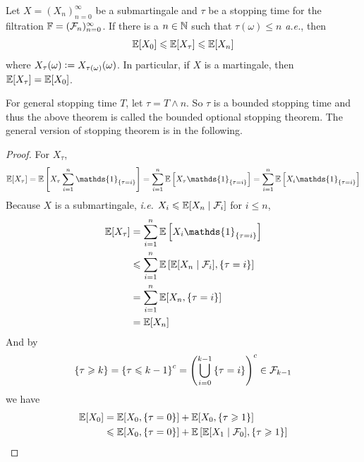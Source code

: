 \documentclass[a4paper,12pt]{article}
\begin{document}
\begin{itemize}
  \begin{thm}
    Let $X=(X_n)_{n=0}^{\infty}$ be a submartingale and $\tau$ be a stopping time for the filtration $\mathbb{F} = (\mathcal{F}_n)_{n=0}^{\infty}$. If there is a $n \in \mathbb{N}$ such that $\tau(\omega) \leqslant n$ \emph{a.e.}, then
    \begin{equation*}
      \mathbb{E}[X_0] \leqslant \mathbb{E}[X_{\tau}] \leqslant \mathbb{E}[X_n]
    \end{equation*}
    where $X_{\tau}(\omega) \vcentcolon= X_{\tau(\omega)}(\omega)$. In particular, if $X$ is a martingale, then $\mathbb{E}[X_{\tau}] = \mathbb{E}[X_0]$.
  \end{thm}
  \begin{rmk}
    For general stopping time $T$, let $\tau = T \wedge n$. So $\tau$ is a bounded stopping time and thus the above theorem is called the bounded optional stopping theorem. The general version of stopping theorem is in the following.
  \end{rmk}
  \begin{proof}
    For $X_{\tau}$,
    \begin{equation*}
      \E[X_{\tau}] = \E\bj{X_{\tau}\sum_{i=1}^n\mathds{1}_{\bb{\tau=i}}} = \sum_{i=1}^n\E\bj{X_{\tau}\mathds{1}_{\bb{\tau=i}}} = \sum_{i=1}^n\E\bj{X_{i}\mathds{1}_{\bb{\tau=i}}}
    \end{equation*}
    Because $X$ is a submartingale, \emph{i.e.} $X_i \leqslant \mathbb{E}[X_n \mid \mathcal{F}_i]$ for $i \leqslant n$,
    \begin{equation*}
      \begin{split}
        \E[X_{\tau}] &= \sum_{i=1}^n\E\bj{X_{i}\mathds{1}_{\bb{\tau=i}}} \\
        &\leqslant \sum_{i=1}^n \E\bj{\E[X_n \mid \mathcal{F}_i], \bb{\tau=i}} \\
        &= \sum_{i=1}^n \E[X_n, \bb{\tau=i}] \\
        &= \E[X_n]
      \end{split}
    \end{equation*}
    And by
    \begin{equation*}
      \left\{\tau \geqslant k\right\} = \left\{\tau \leqslant k-1\right\}^c = \left(\bigcup_{i=0}^{k-1}\left\{\tau = i\right\}\right)^c \in \mathcal{F}_{k-1}
    \end{equation*}
    we have
    \begin{equation*}
      \begin{split}
        \E[X_0] &= \E[X_0, \bb{\tau = 0}] + \E[X_0, \bb{\tau \geqslant 1}] \\
        &\leqslant \E[X_0, \bb{\tau = 0}] + \E\bj{\E[X_1\mid \mathcal{F}_0], \bb{\tau \geqslant 1}} \\

\end{split}
\end{equation*}
\end{proof}
\end{itemize}
\end{document}
